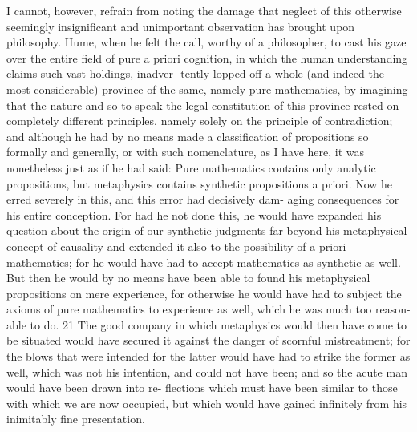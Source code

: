 I cannot, however, refrain from noting the damage that neglect of
this otherwise seemingly insigniﬁcant and unimportant observation has
brought upon philosophy. Hume, when he felt the call, worthy of a
philosopher, to cast his gaze over the entire ﬁeld of pure a priori cognition,
in which the human understanding claims such vast holdings, inadver-
tently lopped off a whole (and indeed the most considerable) province
of the same, namely pure mathematics, by imagining that the nature and
so to speak the legal constitution of this province rested on completely
different principles, namely solely on the principle of contradiction; and
although he had by no means made a classiﬁcation of propositions so
formally and generally, or with such nomenclature, as I have here, it
was nonetheless just as if he had said: Pure mathematics contains only
analytic propositions, but metaphysics contains synthetic propositions a
priori. Now he erred severely in this, and this error had decisively dam-
aging consequences for his entire conception. For had he not done this,
he would have expanded his question about the origin of our synthetic
judgments far beyond his metaphysical concept of causality and extended
it also to the possibility of a priori mathematics; for he would have had
to accept mathematics as synthetic as well. But then he would by no
means have been able to found his metaphysical propositions on mere
experience, for otherwise he would have had to subject the axioms of
pure mathematics to experience as well, which he was much too reason-
able to do. 21 The good company in which metaphysics would then have
come to be situated would have secured it against the danger of scornful
mistreatment; for the blows that were intended for the latter would have
had to strike the former as well, which was not his intention, and could
not have been; and so the acute man would have been drawn into re-
ﬂections which must have been similar to those with which we are now
occupied, but which would have gained inﬁnitely from his inimitably
fine presentation.

